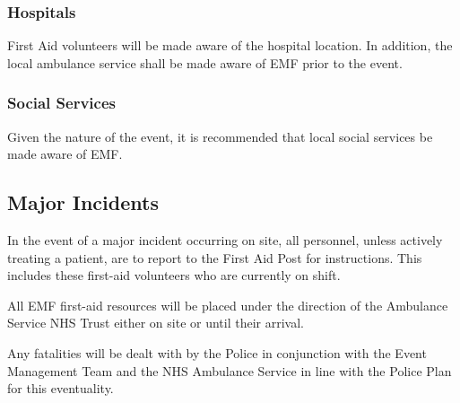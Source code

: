 \subsubsection{Hospitals}

First Aid volunteers will be made aware of the hospital location. In addition,
the local ambulance service shall be made aware of EMF prior to the event.

\subsubsection{Social Services}

Given the nature of the event, it is recommended that local social services be made aware of EMF.

\subsection{Major Incidents}

In the event of a major incident occurring on site, all personnel, unless
actively treating a patient, are to report to the First Aid Post for
instructions. This includes these first-aid volunteers who are currently on
shift.

All EMF first-aid resources will be placed under the direction of the Ambulance
Service NHS Trust either on site or until their arrival.

Any fatalities will be dealt with by the Police in conjunction with the Event
Management Team and the NHS Ambulance Service in line with the Police Plan for
this eventuality.
